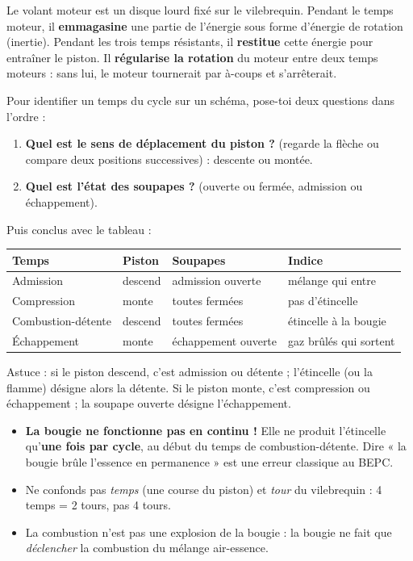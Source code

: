 \documentclass[11pt]{article}
\newcommand{\cle}[1]{{\popxbold\color{popdark}#1}}
\begin{document}
\begin{definition}
Le \cle{volant moteur} est un disque lourd fixé sur le vilebrequin. Pendant le temps moteur, il \textbf{emmagasine} une partie de l'énergie sous forme d'énergie de rotation (inertie). Pendant les trois temps résistants, il \textbf{restitue} cette énergie pour entraîner le piston. Il \textbf{régularise la rotation} du moteur entre deux temps moteurs : sans lui, le moteur tournerait par à-coups et s'arrêterait.
\end{definition}

\begin{methode}
Pour identifier un temps du cycle sur un schéma, pose-toi deux questions dans l'ordre :
\begin{enumerate}
\item \textbf{Quel est le sens de déplacement du piston ?} (regarde la flèche ou compare deux positions successives) : descente ou montée.
\item \textbf{Quel est l'état des soupapes ?} (ouverte ou fermée, admission ou échappement).
\end{enumerate}
Puis conclus avec le tableau :
\begin{center}
\begin{tabularx}{\linewidth}{|l|X|X|X|}
\hline
\rowcolor{popblueL} \textbf{Temps} & \textbf{Piston} & \textbf{Soupapes} & \textbf{Indice} \\
\hline
Admission & descend & admission ouverte & mélange qui entre \\
\hline
Compression & monte & toutes fermées & pas d'étincelle \\
\hline
Combustion-détente & descend & toutes fermées & étincelle à la bougie \\
\hline
Échappement & monte & échappement ouverte & gaz brûlés qui sortent \\
\hline
\end{tabularx}
\end{center}
Astuce : si le piston descend, c'est admission ou détente ; l'étincelle (ou la flamme) désigne alors la détente. Si le piston monte, c'est compression ou échappement ; la soupape ouverte désigne l'échappement.
\end{methode}

\begin{attention}
\begin{itemize}
\item \textbf{La bougie ne fonctionne pas en continu !} Elle ne produit l'étincelle qu'\textbf{une fois par cycle}, au début du temps de combustion-détente. Dire « la bougie brûle l'essence en permanence » est une erreur classique au BEPC.
\item Ne confonds pas \emph{temps} (une course du piston) et \emph{tour} du vilebrequin : 4 temps = 2 tours, pas 4 tours.
\item La combustion n'est pas une explosion de la bougie : la bougie ne fait que \emph{déclencher} la combustion du mélange air-essence.
\end{itemize}
\end{attention}
\end{document}
